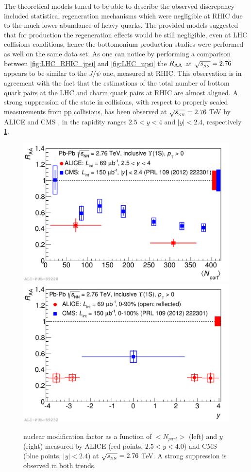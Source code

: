 The theoretical models tuned to be able to describe the observed discrepancy included statistical regeneration mechanisms which were negligible at RHIC due to the much lower abundance of heavy quarks.
The provided models suggested that for \upsis production the regeneration effects would be still negligible, even at LHC collisions conditions, hence the bottomonium production studies were performed as well on the same data set.
As one can notice by performing a comparison between \ref{fig:LHC_RHIC_jpsi} and \ref{fig:LHC_upsi} the \upsi $R_{\rm{AA}}$ at $\sqrt{s_{_{\rm NN}}}=2.76$ appears to be similar to the $J/\psi$ one, measured at RHIC.
This observation is in agreement with the fact that the estimations of the total number of bottom quark pairs at the LHC and charm quark pairs at RHIC are almost aligned.
A strong suppression of the \upsis state in \pbpb collisions, with respect to properly scaled measurements from pp collisions, has been observed at $\sqrt{s_{_{\rm NN}}}=2.76$ \rm{TeV} by ALICE \cite{Abelev:2014nua} and CMS \cite{Chatrchyan:2012lxa,Khachatryan:2016xxp}, in the rapidity ranges $2.5<y<4$ and $|y|<2.4$, respectively \ref{fig:ALICE_CMS_upsi}. 

\begin{figure}[!t]
\begin{center}
\includegraphics[width=0.47\linewidth]{Chapters/Analysis/Figs/2014-Nov-05-Raa_CMS_centr.pdf}
\includegraphics[width=0.47\linewidth]{Chapters/Analysis/Figs/2014-Nov-05-Raa_CMS_rap.pdf}
\caption{\upsis nuclear modification factor as a function of $<N_{part}>$ (left) and $y$ (right) measured by ALICE (red points, $2.5<y<4.0$) and CMS (blue points, $|y|<2.4$) at $\sqrt{s_{_{\rm NN}}}=2.76$ \rm{TeV}. A strong suppression is observed in both trends.}
\label{fig:ALICE_CMS_upsi}
\end{center}
\end{figure}

